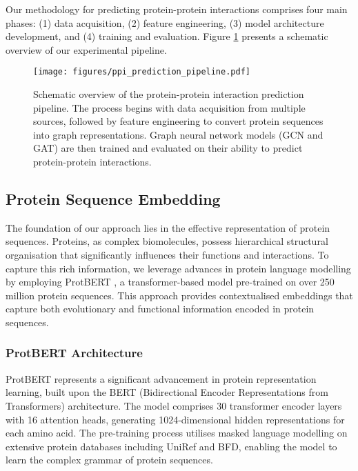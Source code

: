 \documentclass[12pt,a4paper]{article}
\begin{document}
Our methodology for predicting protein-protein interactions comprises four main phases: (1) data acquisition, (2) feature engineering, (3) model architecture development, and (4) training and evaluation. Figure \ref{fig:pipeline} presents a schematic overview of our experimental pipeline.

\begin{figure}[H]
    \centering
    \texttt{[image: figures/ppi\_prediction\_pipeline.pdf]}
    \caption{Schematic overview of the protein-protein interaction prediction pipeline. The process begins with data acquisition from multiple sources, followed by feature engineering to convert protein sequences into graph representations. Graph neural network models (GCN and GAT) are then trained and evaluated on their ability to predict protein-protein interactions.}
    \label{fig:pipeline}
\end{figure}

\subsection{Protein Sequence Embedding}
\label{sec:protein_embedding}

The foundation of our approach lies in the effective representation of protein sequences. Proteins, as complex biomolecules, possess hierarchical structural organisation that significantly influences their functions and interactions. To capture this rich information, we leverage advances in protein language modelling by employing ProtBERT \cite{elnaggar2021prottrans}, a transformer-based model pre-trained on over 250 million protein sequences. This approach provides contextualised embeddings that capture both evolutionary and functional information encoded in protein sequences.

\subsubsection{ProtBERT Architecture}

ProtBERT represents a significant advancement in protein representation learning, built upon the BERT (Bidirectional Encoder Representations from Transformers) architecture. The model comprises 30 transformer encoder layers with 16 attention heads, generating 1024-dimensional hidden representations for each amino acid. The pre-training process utilises masked language modelling on extensive protein databases including UniRef and BFD, enabling the model to learn the complex grammar of protein sequences.
\end{document}
